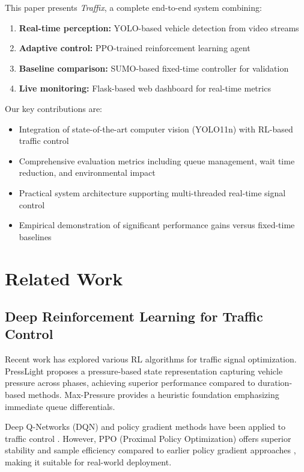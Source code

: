 \documentclass[10pt,conference]{IEEEtran}
\begin{document}
This paper presents \textit{Traffix}, a complete end-to-end system combining:
\begin{enumerate}
    \item \textbf{Real-time perception:} YOLO-based vehicle detection from video streams
    \item \textbf{Adaptive control:} PPO-trained reinforcement learning agent
    \item \textbf{Baseline comparison:} SUMO-based fixed-time controller for validation
    \item \textbf{Live monitoring:} Flask-based web dashboard for real-time metrics
\end{enumerate}

Our key contributions are:
\begin{itemize}
    \item Integration of state-of-the-art computer vision (YOLO11n) with RL-based traffic control
    \item Comprehensive evaluation metrics including queue management, wait time reduction, and environmental impact
    \item Practical system architecture supporting multi-threaded real-time signal control
    \item Empirical demonstration of significant performance gains versus fixed-time baselines
\end{itemize}

\section{Related Work}

\subsection{Deep Reinforcement Learning for Traffic Control}
Recent work has explored various RL algorithms for traffic signal optimization. PressLight \cite{wei2019presslight} proposes a pressure-based state representation capturing vehicle pressure across phases, achieving superior performance compared to duration-based methods. Max-Pressure \cite{varaiya2013max} provides a heuristic foundation emphasizing immediate queue differentials.

Deep Q-Networks (DQN) and policy gradient methods have been applied to traffic control \cite{liang2018deep}. However, PPO (Proximal Policy Optimization) offers superior stability and sample efficiency compared to earlier policy gradient approaches \cite{schulman2017proximal}, making it suitable for real-world deployment.
\end{document}
